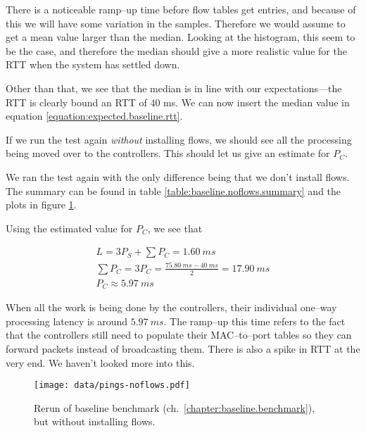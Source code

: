 There is a noticeable ramp--up time before flow tables get entries, and
because of this we will have some variation in the samples. Therefore we
would assume to get a mean value larger than the median.  Looking at the
histogram, this seem to be the case, and therefore the median should give a
more realistic value for the RTT when the system has settled down.

Other than that, we see that the median is in line with our
expectations---the RTT is clearly bound an RTT of 40 ms.  We can now insert
the median value in equation \ref{equation:expected.baseline.rtt}.



If we run the test again \textit{without} installing flows, we should see
all the processing being moved over to the controllers.  This should let us
give an estimate for $P_C$.

We ran the test again  with the only difference being that we don't
install flows.  The summary can be found in table
\ref{table:baseline.noflows.summary} and the plots in figure
\ref{figure:baseline.noflows.plots}.

Using the estimated value for $P_C$, we see that

\begin{gather*}
  L = 3P_S + \sum P_C = 1.60~ms \\
  \sum P_C = 3P_C = \frac{75.80~ms - 40~ms}{2} = 17.90~ms \\
  P_C \approx 5.97~ms
\end{gather*}

When all the work is being done by the controllers, their individual
one--way processing latency is around $5.97~ms$.  The ramp--up this time
refers to the fact that the controllers still need to populate their
MAC--to--port tables so they can forward packets instead of broadcasting
them.  There is also a spike in RTT at the very end.  We haven't looked more
into this.



\begin{figure}
  \centering
  \texttt{[image: data/pings-noflows.pdf]}
  \caption{Rerun of baseline benchmark
    (ch.~\ref{chapter:baseline.benchmark}), but without installing flows.}
  \label{figure:baseline.noflows.plots}
\end{figure}

